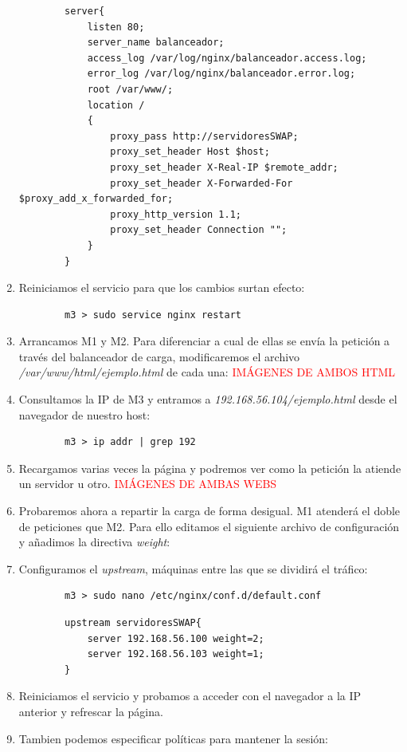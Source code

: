 \documentclass[12pt,spanish]{article}
\begin{document}
\begin{enumerate}
\begin{lstlisting}
		server{
			listen 80;
			server_name balanceador;
			access_log /var/log/nginx/balanceador.access.log;
			error_log /var/log/nginx/balanceador.error.log;
			root /var/www/;
			location /
			{
				proxy_pass http://servidoresSWAP;
				proxy_set_header Host $host;
				proxy_set_header X-Real-IP $remote_addr;
				proxy_set_header X-Forwarded-For $proxy_add_x_forwarded_for;
				proxy_http_version 1.1;
				proxy_set_header Connection "";
			}
		}
		\end{lstlisting}
		\item Reiniciamos el servicio para que los cambios surtan efecto:
		\begin{lstlisting}
		m3 > sudo service nginx restart
		\end{lstlisting}
		\item Arrancamos M1 y M2. Para diferenciar a cual de ellas se envía la petición a través del balanceador de carga, modificaremos el archivo \emph{/var/www/html/ejemplo.html} de cada una:
		\textcolor{red}{IMÁGENES DE AMBOS HTML}
		\item Consultamos la IP de M3 y entramos a \emph{192.168.56.104/ejemplo.html} desde el navegador de nuestro host:
		\begin{lstlisting}
		m3 > ip addr | grep 192
		\end{lstlisting}
		\item Recargamos varias veces la página y podremos ver como la petición la atiende un servidor u otro.
		\textcolor{red}{IMÁGENES DE AMBAS WEBS}
		\item Probaremos ahora a repartir la carga de forma desigual. M1 atenderá el doble de peticiones que M2. Para ello editamos el siguiente archivo de configuración y añadimos la directiva \emph{weight}:
		\item Configuramos el \emph{upstream}, máquinas entre las que se dividirá el tráfico:
		\begin{lstlisting}
		m3 > sudo nano /etc/nginx/conf.d/default.conf
		\end{lstlisting}
		\begin{lstlisting}
		upstream servidoresSWAP{
			server 192.168.56.100 weight=2;
			server 192.168.56.103 weight=1;
		}
		\end{lstlisting}
		\item Reiniciamos el servicio y probamos a acceder con el navegador a la IP anterior y refrescar la página.
		\item Tambien podemos especificar políticas para mantener la sesión:
		\begin{itemize}

\end{itemize}
\end{enumerate}
\end{document}
